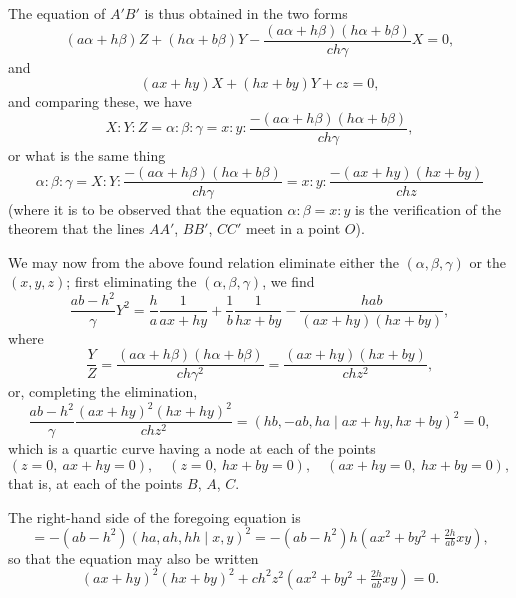 \documentclass[11pt,a4paper]{article}
\theoremstyle{plain}
\begin{document}
The equation of $A'B'$ is thus obtained in the two forms
\begin{equation}
(a\alpha + h\beta)Z + (h\alpha + b\beta)Y - \frac{(a\alpha + h\beta)(h\alpha + b\beta)}{ch\gamma}X = 0,
\end{equation}
and
\begin{equation}
(ax + hy)X + (hx + by)Y + cz = 0,
\end{equation}
and comparing these, we have
\begin{equation}
X : Y : Z = \alpha : \beta : \gamma = x : y : \frac{-(a\alpha + h\beta)(h\alpha + b\beta)}{ch\gamma},
\end{equation}
or what is the same thing
\begin{equation}
\alpha : \beta : \gamma = X : Y : \frac{-(a\alpha + h\beta)(h\alpha + b\beta)}{ch\gamma} = x : y : \frac{-(ax + hy)(hx + by)}{chz}
\end{equation}
(where it is to be observed that the equation $\alpha : \beta = x : y$ is the verification of the theorem that the lines $AA'$, $BB'$, $CC'$ meet in a point $O$).

\newpage
\setcounter{equation}{23}

We may now from the above found relation eliminate either the $(\alpha, \beta, \gamma)$ or the $(x, y, z)$; first eliminating the $(\alpha, \beta, \gamma)$, we find
\begin{equation}
\frac{ab-h^2}{\gamma}Y^2 = \frac{h}{a}\frac{1}{ax + hy} + \frac{1}{b}\frac{1}{hx + by} - \frac{hab}{(ax + hy)(hx + by)},
\end{equation}
where
\begin{equation}
\frac{Y}{Z} = \frac{(a\alpha + h\beta)(h\alpha + b\beta)}{ch\gamma^2} = \frac{(ax + hy)(hx + by)}{chz^2},
\end{equation}
or, completing the elimination,
\begin{equation}
\frac{ab-h^2}{\gamma}\frac{(ax + hy)^2(hx + hy)^2}{chz^2} = (hb, -ab, ha \mid ax + hy, hx + by)^2 = 0,
\end{equation}
which is a quartic curve having a node at each of the points
\begin{equation}
(z = 0,\ ax + hy = 0), \quad (z = 0,\ hx + by = 0), \quad (ax + hy = 0,\ hx + by = 0),
\end{equation}
that is, at each of the points $B$, $A$, $C$.

The right-hand side of the foregoing equation is
\begin{equation}
= -(ab - h^2)(ha, ah, hh \mid x, y)^2 = -(ab - h^2)h(ax^2 + by^2 + \tfrac{2h}{ab}xy),
\end{equation}
so that the equation may also be written
\begin{equation}
(ax + hy)^2(hx + by)^2 + ch^2z^2\left(ax^2 + by^2 + \tfrac{2h}{ab}xy\right) = 0.
\end{equation}
\end{document}
